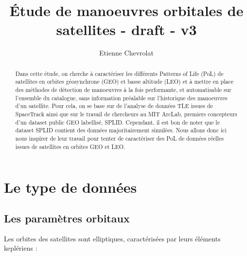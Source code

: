 \documentclass{article}
\title{Étude de manoeuvres orbitales de satellites - draft - v3}
\author{Etienne Chevrolat}
\date{}
\begin{document}
\maketitle

\begin{abstract}
    Dans cette étude, on cherche à caractériser les différents Patterns of Life (PoL) de satellites en orbites géosynchrone (GEO) et basse altitude (LEO) et à mettre en place des méthodes de détection de manoeuvres à la fois performante, et automatisable sur l'ensemble du catalogue, sans information préalable sur l'historique des manoeuvres d'un satellite.
    Pour cela, on se base sur de l'analyse de données TLE issues de SpaceTrack ainsi que sur le travail de chercheurs au MIT ArcLab, premiers concepteurs d'un dataset public GEO labellisé, SPLID.
    Cependant, il est bon de noter que le dataset SPLID contient des données majoritairement simulées. Nous allons donc ici nous inspirer de leur travail pour tenter de caractériser des PoL de données réelles issues de satellites en orbites GEO et LEO.
\end{abstract}

\section{Le type de données }

\subsection{Les paramètres orbitaux}

Les orbites des satellites sont elliptiques, caractérisées par leurs éléments keplériens :

\vspace{0.3cm}
\noindent{}
\vspace{0.5cm}
\end{document}
